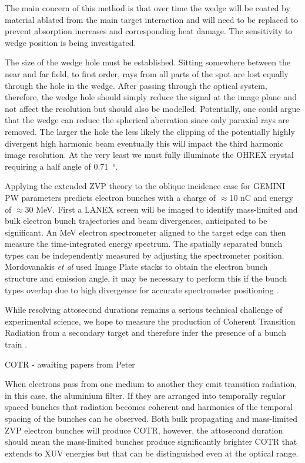 The main concern of this method is that over time the wedge will be coated by material ablated from the main target interaction and will need to be replaced to prevent absorption increases and corresponding heat damage. The sensitivity to wedge position is being investigated.

The size of the wedge hole must be established. Sitting somewhere between the near and far field, to first order, rays from all parts of the spot are lost equally through the hole in the wedge. After passing through the optical system, therefore, the wedge hole should simply reduce the signal at the image plane and not affect the resolution but should also be modelled. Potentially, one could argue that the wedge can reduce the spherical aberration since only paraxial rays are removed. The larger the hole the less likely the clipping of the potentially highly divergent high harmonic beam eventually this will impact the third harmonic image resolution. At the very least we must fully illuminate the OHREX crystal requiring a half angle of \qty{0.71}{\degree}.

Applying the extended ZVP theory to the oblique incidence case for GEMINI PW parameters predicts electron bunches with a charge of $\approx$10 nC and energy of $\approx$30 MeV.
First a LANEX screen will be imaged to identify mass-limited and bulk electron bunch trajectories and beam divergences, anticipated to be significant. An MeV electron spectrometer aligned to the target edge can then measure the time-integrated energy spectrum. The spatially separated bunch types can be independently measured by adjusting the spectrometer position. Mordovanakis \textit{et al} used Image Plate stacks to obtain the electron bunch structure and emission angle, it may be necessary to perform this if the bunch types overlap due to high divergence for accurate spectrometer positioning \cite{mordovanakisQuasimonoenergeticElectronBeams2009}. 

While resolving attosecond durations remains a serious technical challenge of experimental science, we hope to measure the production of Coherent Transition Radiation from a secondary target and therefore infer the presence of a bunch train \cite{linIsolatedAttosecondElectron2020}. 


COTR - awaiting papers from Peter

When electrons pass from one medium to another they emit transition radiation, in this case, the aluminium filter. If they are arranged into temporally regular spaced bunches that radiation becomes coherent and harmonics of the temporal spacing of the bunches can be observed. Both bulk propagating and mass-limited ZVP electron bunches will produce COTR, however, the attosecond duration should mean the mass-limited bunches produce significantly brighter COTR that extends to XUV energies but that can be distinguished even at the optical range.


